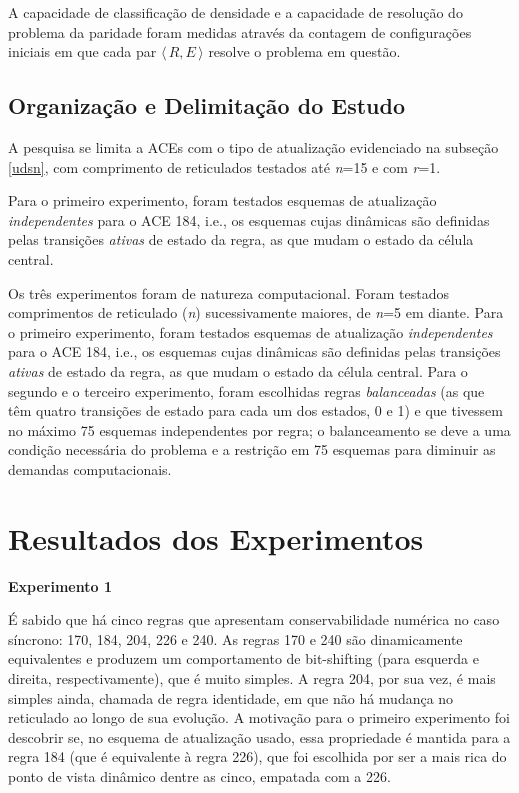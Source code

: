 \documentclass[a4paper,12pt]{ltxdoc}
\newcommand\tab[1][1cm]{\hspace*{#1}}
\begin{document}
\tab A capacidade de classificação de densidade e a capacidade de resolução do problema da paridade foram medidas através da contagem de configurações iniciais em que cada par $\langle\,R,E\,\rangle$ resolve o problema em questão.

\subsection{Organização e Delimitação do Estudo} \label{delimitacao}

A pesquisa se limita a ACEs com o tipo de atualização evidenciado na subseção \ref{udsn}, com comprimento de reticulados testados até \textit{n}=15 e com \textit{r}=1. 

\tab Para o primeiro experimento, foram testados esquemas de atualização \textit{independentes} para o ACE 184, i.e., os esquemas cujas dinâmicas são definidas pelas transições \textit{ativas} de estado da regra, as que mudam o estado da célula central. 

\tab Os três experimentos foram de natureza computacional. Foram testados comprimentos de reticulado (\textit{n}) sucessivamente maiores, de \textit{n}=5 em diante. Para o primeiro experimento, foram testados esquemas de atualização \textit{independentes} para o ACE 184, i.e., os esquemas cujas dinâmicas são definidas pelas transições \textit{ativas} de estado da regra, as que mudam o estado da célula central. Para o segundo e o terceiro experimento, foram escolhidas regras \textit{balanceadas} (as que têm quatro transições de estado para cada um dos estados, 0 e 1) e que tivessem no máximo 75 esquemas independentes por regra; o balanceamento se deve a uma condição necessária do problema e a restrição em 75 esquemas para diminuir as demandas computacionais.

\break
\section{Resultados dos Experimentos} \label{resultados}

\textbf{Experimento 1}

\tab É sabido que há cinco regras que apresentam conservabilidade numérica no caso síncrono: 170, 184, 204, 226 e 240. As regras 170 e 240 são dinamicamente equivalentes e produzem um comportamento de bit-shifting (para esquerda e direita, respectivamente), que é muito simples. A regra 204, por sua vez, é mais simples ainda, chamada de regra identidade, em que não há mudança no reticulado ao longo de sua evolução. A motivação para o primeiro experimento foi descobrir se, no esquema de atualização usado, essa propriedade é mantida para a regra 184 (que é equivalente à regra 226), que foi escolhida por ser a mais rica do ponto de vista dinâmico dentre as cinco, empatada com a 226.
\end{document}
